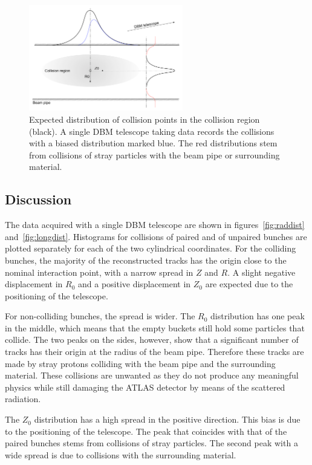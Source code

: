 \begin{figure}[!t]
\centering
\includegraphics[width=0.6\textwidth]{04_charge_monitoring/pics/positioningdata}
\caption{Expected distribution of collision points in the collision region (black). A single DBM telescope taking data records the collisions with a biased distribution marked blue. The red distributions stem from collisions of stray particles with the beam pipe or surrounding material.}
\label{fig:positioningdata}
\end{figure}

\subsection{Discussion}
The data acquired with a single DBM telescope are shown in figures~\ref{fig:raddist} and~\ref{fig:longdist}. Histograms for collisions of paired and of unpaired bunches are plotted separately for each of the two cylindrical coordinates. For the colliding bunches, the majority of the reconstructed tracks has the origin close to the nominal interaction point, with a narrow spread in $Z$ and $R$. A slight negative displacement in $R_\mathrm{0}$ and a positive displacement in $Z_\mathrm{0}$ are expected due to the positioning of the telescope.

For non-colliding bunches, the spread is wider. The $R_\mathrm{0}$ distribution has one peak in the middle, which means that the empty buckets still hold some particles that collide. The two peaks on the sides, however, show that a significant number of tracks has their origin at the radius of the beam pipe. Therefore these tracks are made by stray protons colliding with the beam pipe and the surrounding material. These collisions are unwanted as they do not produce any meaningful physics while still damaging the ATLAS detector by means of the scattered radiation. 

The $Z_\mathrm{0}$ distribution has a high spread in the positive direction. This bias is due to the positioning of the telescope. The peak that coincides with that of the paired bunches stems from collisions of stray particles. The second peak with a wide spread is due to collisions with the surrounding material.

